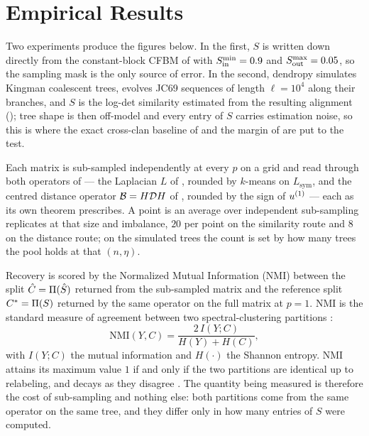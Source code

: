 \section{Empirical Results}\label{sec:empirical}

Two experiments produce the figures below. In the first, $S$ is written down directly from the constant-block CFBM of  with $S_{\mathrm{in}}^{\min}=0.9$ and $S_{\mathrm{out}}^{\max}=0.05$, so the sampling mask is the only source of error. In the second, dendropy simulates Kingman coalescent trees, evolves JC69 sequences of length $\ell=10^4$ along their branches, and $S$ is the log-det similarity estimated from the resulting alignment (); tree shape is then off-model and every entry of $S$ carries estimation noise, so this is where the exact cross-clan baseline of  and the margin of  are put to the test.

Each matrix is sub-sampled independently at every $p$ on a grid and read through both operators of  --- the Laplacian $L$ of , rounded by $k$-means on $L_{\mathrm{sym}}$, and the centred distance operator $\mathcal{B}=H\mathcal{D} H$ of , rounded by the sign of $u^{(1)}$ --- each as its own theorem prescribes. A point is an average over independent sub-sampling replicates at that size and imbalance, $20$ per point on the similarity route and $8$ on the distance route; on the simulated trees the count is set by how many trees the pool holds at that $(n,\eta)$.

Recovery is scored by the Normalized Mutual Information (NMI) between the split $\hat C=\Pi(\hat S)$ returned from the sub-sampled matrix and the reference split $C^\ast=\Pi(S)$ returned by the same operator on the full matrix at $p=1$. NMI is the standard measure of agreement between two spectral-clustering partitions \cite{fortunato2010community, qinrohe2013regularized}:
\begin{equation}\label{eq:nmi_def}
   \mathrm{NMI}(Y,C)=\frac{2\,I(Y;C)}{H(Y)+H(C)},
\end{equation}
with $I(Y;C)$ the mutual information and $H(\cdot)$ the Shannon entropy. NMI attains its maximum value $1$ if and only if the two partitions are identical up to relabeling, and decays as they disagree \cite{strehlghosh2002cluster, fortunato2010community}. The quantity being measured is therefore the cost of sub-sampling and nothing else: both partitions come from the same operator on the same tree, and they differ only in how many entries of $S$ were computed.

